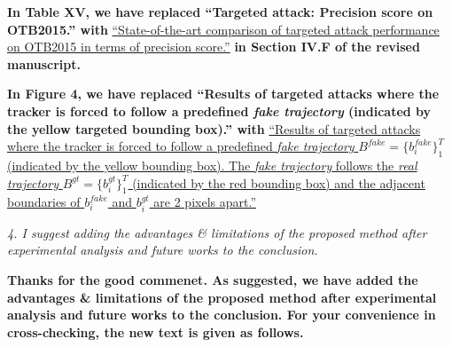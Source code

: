\documentclass[12pt]{article}
\begin{document}
\textbf{In Table XV, we have replaced ``Targeted attack: Precision score on OTB2015.'' with}
\uline{``State-of-the-art comparison of targeted attack performance on OTB2015 in terms of precision score.''}
\textbf{in Section IV.F of the revised manuscript.}

\textbf{In Figure 4, we have replaced ``Results of targeted attacks where the tracker is forced to follow a predefined \textit{fake trajectory} (indicated by the yellow targeted bounding box).'' with}
\uline{``Results of targeted attacks where the tracker is forced to follow a predefined \textit{fake trajectory} $B^{fake}=\{b^{fake}_i\}_1^{T}$ (indicated by the yellow bounding box). The \textit{fake trajectory} follows the \textit{real trajectory} $B^{gt}=\{b^{gt}_i\}_1^T$ (indicated by the red bounding box) and the adjacent boundaries of $b^{fake}_i$ and $b^{gt}_i$ are 2 pixels apart.''}


\textit{4. I suggest adding the advantages \& limitations of the proposed method after experimental analysis and future works to the conclusion.}

\textbf{Thanks for the good commenet. As suggested, we have added the advantages \& limitations of the proposed method after experimental analysis and future works to the conclusion. For your convenience in cross-checking, the new text is given as follows.}
\end{document}
